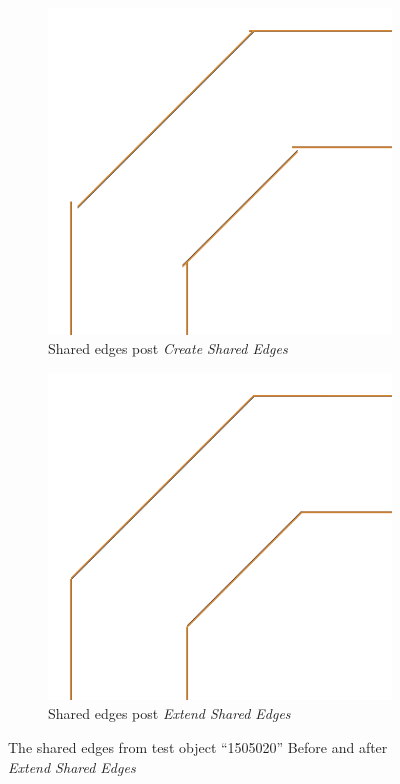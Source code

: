 \begin{figure}[htb]
	\centering
	\begin{subfigure}{0.45\textwidth}
		\centering
		\includegraphics[width=\linewidth]{../resources/geo_simp/1505020_shared_edges_tr.png}
		\caption{Shared edges post \textit{Create Shared Edges}}
		\label{sfig:gs_shared_edges}
	\end{subfigure}
	\hfill
	\begin{subfigure}{0.45\textwidth}
		\centering
		\includegraphics[width=\linewidth]{../resources/geo_simp/1505020_shared_edges_clamped_tr.png}
		\caption{Shared edges post \textit{Extend Shared Edges}}
		\label{sfig:gs_shared_edges_clamped}
	\end{subfigure}
\caption{
The shared edges from test object ``1505020'' Before and after \textit{Extend Shared Edges}
}
	\label{fig:extend_shared_edges}
\end{figure}

